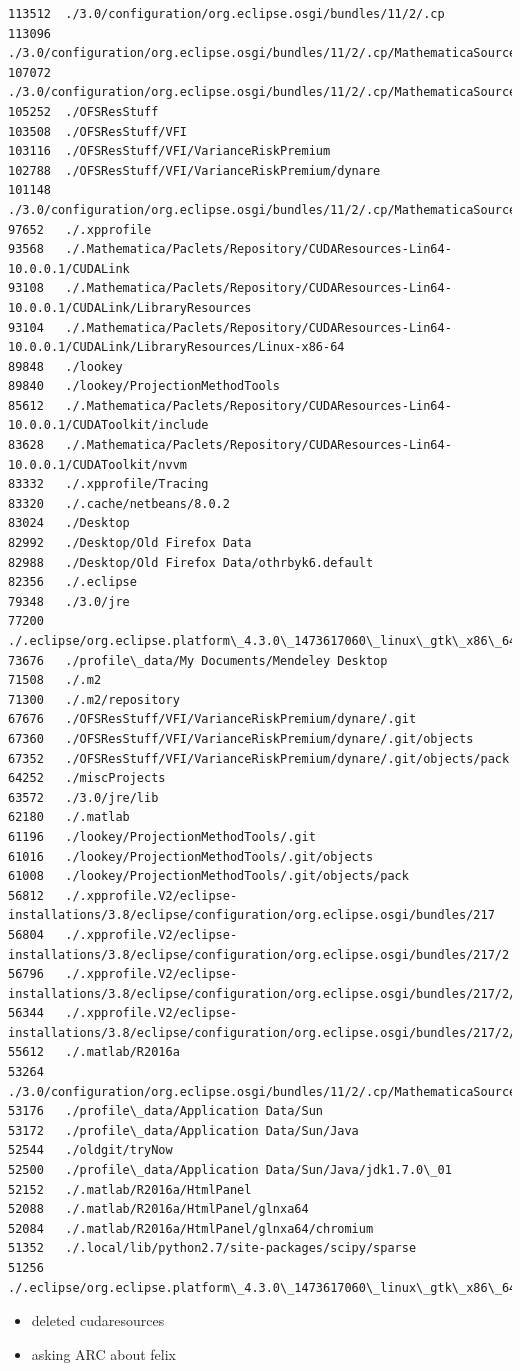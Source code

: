 \documentclass[hyperref]{labbook}
\begin{document}
\begin{verbatim}
113512	./3.0/configuration/org.eclipse.osgi/bundles/11/2/.cp
113096	./3.0/configuration/org.eclipse.osgi/bundles/11/2/.cp/MathematicaSource
107072	./3.0/configuration/org.eclipse.osgi/bundles/11/2/.cp/MathematicaSource/DocumentationBuild
105252	./OFSResStuff
103508	./OFSResStuff/VFI
103116	./OFSResStuff/VFI/VarianceRiskPremium
102788	./OFSResStuff/VFI/VarianceRiskPremium/dynare
101148	./3.0/configuration/org.eclipse.osgi/bundles/11/2/.cp/MathematicaSource/DocumentationBuild/Internal
97652	./.xpprofile
93568	./.Mathematica/Paclets/Repository/CUDAResources-Lin64-10.0.0.1/CUDALink
93108	./.Mathematica/Paclets/Repository/CUDAResources-Lin64-10.0.0.1/CUDALink/LibraryResources
93104	./.Mathematica/Paclets/Repository/CUDAResources-Lin64-10.0.0.1/CUDALink/LibraryResources/Linux-x86-64
89848	./lookey
89840	./lookey/ProjectionMethodTools
85612	./.Mathematica/Paclets/Repository/CUDAResources-Lin64-10.0.0.1/CUDAToolkit/include
83628	./.Mathematica/Paclets/Repository/CUDAResources-Lin64-10.0.0.1/CUDAToolkit/nvvm
83332	./.xpprofile/Tracing
83320	./.cache/netbeans/8.0.2
83024	./Desktop
82992	./Desktop/Old Firefox Data
82988	./Desktop/Old Firefox Data/othrbyk6.default
82356	./.eclipse
79348	./3.0/jre
77200	./.eclipse/org.eclipse.platform\_4.3.0\_1473617060\_linux\_gtk\_x86\_64
73676	./profile\_data/My Documents/Mendeley Desktop
71508	./.m2
71300	./.m2/repository
67676	./OFSResStuff/VFI/VarianceRiskPremium/dynare/.git
67360	./OFSResStuff/VFI/VarianceRiskPremium/dynare/.git/objects
67352	./OFSResStuff/VFI/VarianceRiskPremium/dynare/.git/objects/pack
64252	./miscProjects
63572	./3.0/jre/lib
62180	./.matlab
61196	./lookey/ProjectionMethodTools/.git
61016	./lookey/ProjectionMethodTools/.git/objects
61008	./lookey/ProjectionMethodTools/.git/objects/pack
56812	./.xpprofile.V2/eclipse-installations/3.8/eclipse/configuration/org.eclipse.osgi/bundles/217
56804	./.xpprofile.V2/eclipse-installations/3.8/eclipse/configuration/org.eclipse.osgi/bundles/217/2
56796	./.xpprofile.V2/eclipse-installations/3.8/eclipse/configuration/org.eclipse.osgi/bundles/217/2/.cp
56344	./.xpprofile.V2/eclipse-installations/3.8/eclipse/configuration/org.eclipse.osgi/bundles/217/2/.cp/MathematicaSource
55612	./.matlab/R2016a
53264	./3.0/configuration/org.eclipse.osgi/bundles/11/2/.cp/MathematicaSource/DocumentationBuild/Internal/data
53176	./profile\_data/Application Data/Sun
53172	./profile\_data/Application Data/Sun/Java
52544	./oldgit/tryNow
52500	./profile\_data/Application Data/Sun/Java/jdk1.7.0\_01
52152	./.matlab/R2016a/HtmlPanel
52088	./.matlab/R2016a/HtmlPanel/glnxa64
52084	./.matlab/R2016a/HtmlPanel/glnxa64/chromium
51352	./.local/lib/python2.7/site-packages/scipy/sparse
51256	./.eclipse/org.eclipse.platform\_4.3.0\_1473617060\_linux\_gtk\_x86\_64/plugin
\end{verbatim}
\begin{itemize}
\item deleted cudaresources
\item asking ARC about felix
\end{itemize}
\end{document}
